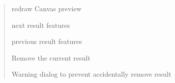 \documentclass[letterpaper,10pt,english]{sphinxmanual}
\begin{document}
\begin{quote}

\begin{fulllineitems}
\label{\detokenize{dialog_interaction:refreshPreview}}
redraw Canvas preview

\end{fulllineitems}


\begin{fulllineitems}
\label{\detokenize{dialog_interaction:nextPreview}}
next result features

\end{fulllineitems}


\begin{fulllineitems}
\label{\detokenize{dialog_interaction:nextPrevious}}
previous result features

\end{fulllineitems}


\begin{fulllineitems}
\label{\detokenize{dialog_interaction:rmFeatResult}}
Remove the current result

\end{fulllineitems}


\begin{fulllineitems}
\label{\detokenize{dialog_interaction:rmWarn}}
Warning dialog to prevent accidentally remove result

\end{fulllineitems}

\end{quote}
\end{document}
